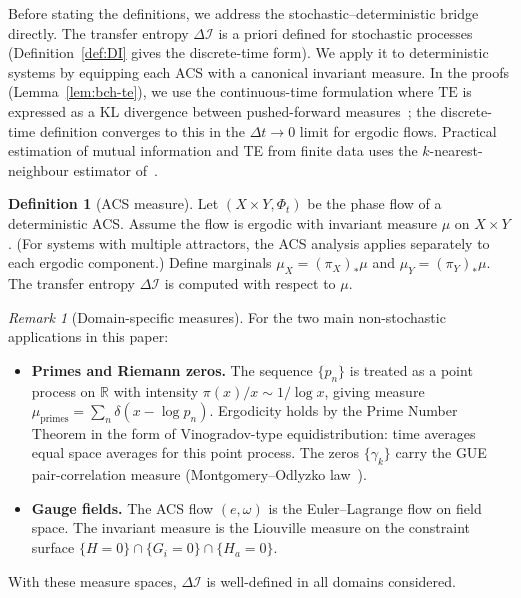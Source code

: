 \documentclass[11pt,a4paper]{article}
\theoremstyle{plain}
\theoremstyle{definition}
\newtheorem{definition}[theorem]{Definition}
\theoremstyle{remark}
\newtheorem{remark}[theorem]{Remark}
\newcommand{\DI}{\Delta\mathcal{I}}
\newcommand{\TE}{\mathrm{TE}}
\begin{document}
Before stating the definitions, we address the stochastic--deterministic
bridge directly.  The transfer entropy $\DI$ is a priori defined for stochastic
processes (Definition~\ref{def:DI} gives the discrete-time form).
We apply it to deterministic systems by equipping each ACS with a
canonical invariant measure.  In the proofs (Lemma~\ref{lem:bch-te}),
we use the continuous-time formulation where $\TE$ is expressed as a
KL divergence between pushed-forward measures~\cite{Schreiber2000,Bossomaier2016};
the discrete-time definition converges to this in the $\Delta t \to 0$ limit
for ergodic flows.  Practical estimation of mutual information and TE
from finite data uses the $k$-nearest-neighbour estimator of~\cite{Kraskov2004}.

\begin{definition}[ACS measure]\label{def:acs-measure}
Let $(X \times Y, \Phi_t)$ be the phase flow of a deterministic ACS.
Assume the flow is ergodic with invariant measure $\mu$ on $X \times Y$.
(For systems with multiple attractors, the ACS analysis applies
separately to each ergodic component.)
Define marginals $\mu_X = (\pi_X)_*\mu$ and $\mu_Y = (\pi_Y)_*\mu$.
The transfer entropy $\DI$ is computed with respect to $\mu$.
\end{definition}

\begin{remark}[Domain-specific measures]
For the two main non-stochastic applications in this paper:
\begin{itemize}[noitemsep]
  \item \textbf{Primes and Riemann zeros.}  The sequence $\{p_n\}$ is treated
    as a point process on $\mathbb{R}$ with intensity $\pi(x)/x \sim 1/\log x$,
    giving measure $\mu_{\mathrm{primes}} = \sum_n \delta(x - \log p_n)$.
    Ergodicity holds by the Prime Number Theorem in the form of Vinogradov-type
    equidistribution: time averages equal space averages for this point process.
    The zeros $\{\gamma_k\}$ carry the GUE pair-correlation measure
    (Montgomery--Odlyzko law~\cite{Montgomery1973,Odlyzko1987}).
  \item \textbf{Gauge fields.}  The ACS flow $(e, \omega)$ is the
    Euler--Lagrange flow on field space.  The invariant measure is the
    Liouville measure on the constraint surface
    $\{H = 0\} \cap \{G_i = 0\} \cap \{H_a = 0\}$.
\end{itemize}
With these measure spaces, $\DI$ is well-defined in all domains considered.
\end{remark}
\end{document}
